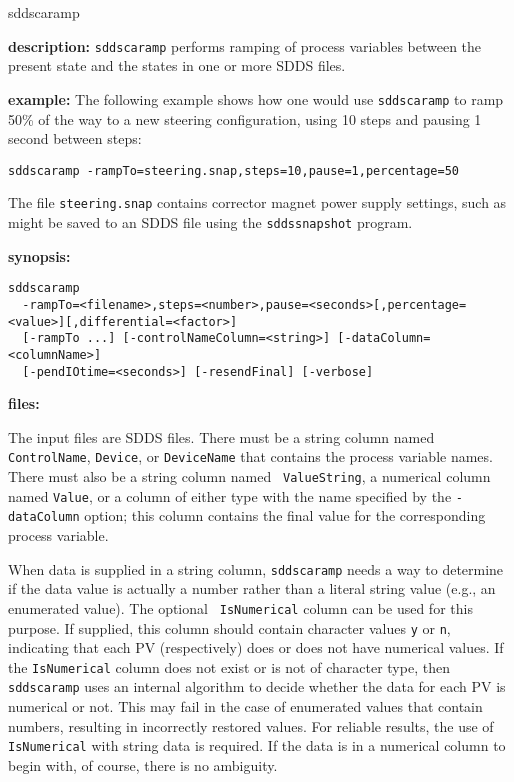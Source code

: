 %
%
\begin{sddsprog}{sddscaramp}
\item {\bf description:}
%
%
\verb+sddscaramp+ performs ramping of process variables between
the present state and the states in one or more SDDS files.

\item {\bf example:} 
%
% 
%
The following example shows how one would use \verb+sddscaramp+ to
ramp 50\% of the way to a new steering configuration, using 10
steps and pausing 1 second between steps: 
\begin{verbatim}
sddscaramp -rampTo=steering.snap,steps=10,pause=1,percentage=50
\end{verbatim}
The file \verb+steering.snap+ contains corrector magnet power supply
settings, such as might be saved to an SDDS file using the
\verb+sddssnapshot+ program.
\item {\bf synopsis:} 
%
%
\begin{verbatim}
sddscaramp
  -rampTo=<filename>,steps=<number>,pause=<seconds>[,percentage=<value>][,differential=<factor>]
  [-rampTo ...] [-controlNameColumn=<string>] [-dataColumn=<columnName>]
  [-pendIOtime=<seconds>] [-resendFinal] [-verbose]
\end{verbatim}
\item {\bf files:}

The input files are SDDS files.  There must be a string column named
{\tt ControlName}, {\tt Device}, or {\tt DeviceName} that contains the
process variable names.  There must also be a string column named {\tt
ValueString}, a numerical column named {\tt Value}, or a column of
either type with the name specified by the \verb+-dataColumn+ option;
this column contains the final value for the corresponding process
variable.  

When data is supplied in a string column, {\tt sddscaramp} needs a way
to determine if the data value is actually a number rather than a
literal string value (e.g., an enumerated value).  The optional {\tt
IsNumerical} column can be used for this purpose.  If supplied, this
column should contain character values {\tt y} or {\tt n}, indicating
that each PV (respectively) does or does not have numerical values.
If the {\tt IsNumerical} column does not exist or is not of character
type, then {\tt sddscaramp} uses an internal algorithm to decide
whether the data for each PV is numerical or not.  This may fail in
the case of enumerated values that contain numbers, resulting in
incorrectly restored values.  For reliable results, the use of {\tt
IsNumerical} with string data is required.  If the data is in a
numerical column to begin with, of course, there is no ambiguity.


\end{sddsprog}
